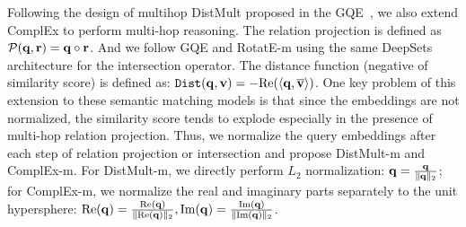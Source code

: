Following the design of multihop DistMult proposed in the GQE~\cite{hamilton2018embedding}, we also extend ComplEx to perform multi-hop reasoning. The relation projection is defined as
% 
$\mathcal{P}(\mathbf{q},\mathbf{r})=\mathbf{q}\circ\mathbf{r}$. And we follow GQE and RotatE-m using the same DeepSets architecture for the intersection operator. The distance function (negative of similarity score) is defined as: $\texttt{Dist}(\mathbf{q},\mathbf{v})=-\text{Re}(\langle\mathbf{q},\overline{\mathbf{v}}\rangle)$. One key problem of this extension to these semantic matching models is that since the embeddings are not normalized, the similarity score tends to explode especially in the presence of multi-hop relation projection. Thus, we normalize the query embeddings after each step of relation projection or intersection and propose DistMult-m and ComplEx-m. For DistMult-m, we directly perform $L_2$ normalization: $\mathbf{q}=\frac{\mathbf{q}}{\|\mathbf{q}\|_2}$; for ComplEx-m, we normalize the real and imaginary parts separately to the unit hypersphere: 
$\text{Re}(\mathbf{q})=\frac{\text{Re}(\mathbf{q})}{\|\text{Re}(\mathbf{q})\|_2}, \text{Im}(\mathbf{q})=\frac{\text{Im}(\mathbf{q})}{\|\text{Im}(\mathbf{q})\|_2}$. 
